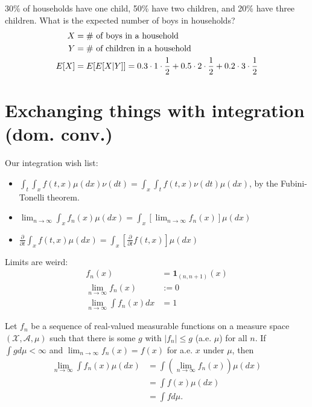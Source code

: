 \documentclass[twoside]{article}
\begin{document}
\begin{example}
30\% of households have one child, 50\% have two children, and 20\% have
three children. What is the expected number of boys in households?
\begin{align*}
  X &= \text{\# of boys in a household} \\
  Y &= \text{\# of children in a household} \\
  E[X] &= E[E[X | Y]]= 0.3 \cdot 1 \cdot \frac{1}{2} + 0.5 \cdot 2 \cdot 
  \frac{1}{2} + 0.2 \cdot 3 \cdot \frac{1}{2}
\end{align*}
\end{example}

\section{Exchanging things with integration (dom. conv.)}

Our integration wish list:
\begin{itemize}
  \item $\int_t \int_x f(t, x) \mu(dx) \nu(dt) = \int_x \int_t f(t, x) \nu(dt)
    \mu(dx)$, by the Fubini-Tonelli theorem.
  \item $\lim_{n \rightarrow \infty} \int_x f_n(x) \mu(dx) = \int_x \left[
    \lim_{n \rightarrow \infty} f_n(x) \right] \mu(dx)$
  \item $\frac{\partial}{\partial t} \int_x f(t, x) \mu(dx) = \int_x
    \left[\frac{\partial}{\partial t} f(t, x)\right] \mu(dx)$
\end{itemize}

Limits are weird:
\begin{align*}
  f_n(x) &= \mathbf{1}_{(n, n+1)}(x) \\
  \lim_{n \rightarrow \infty} f_n(x) &:= 0 \\
  \lim_{n \rightarrow \infty} \int f_n(x) dx &= 1
\end{align*}

\begin{theorem}\citep[Theorem 2.5, p.~29]{keener}
  Let ${f_n}$ be a sequence of real-valued measurable functions on a
  measure space $(\mathcal X, \mathcal A, \mu)$ such that there is some
  $g$ with $|f_n| \le g$ (a.e. $\mu$) for all $n$.  If $\int g d\mu < \infty$
  and $\lim_{n \rightarrow \infty} f_n(x) = f(x)$ for a.e. $x$ under $\mu$,
  then
  \begin{align*}
    \lim_{n \rightarrow \infty} \int f_n(x) \mu(dx) &= \int
      \left(\lim_{n \rightarrow \infty} f_n(x) \right) \mu(dx) \\
       &= \int f(x) \mu(dx) \\
       &= \int f d\mu.
  \end{align*} 
\end{theorem}
\end{document}
